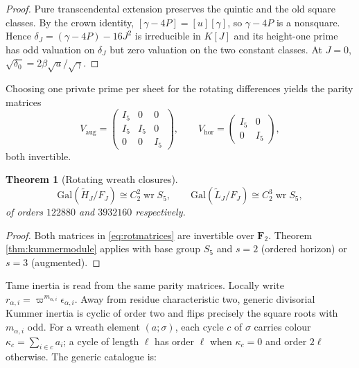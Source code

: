 \documentclass[11pt,a4paper]{article}
\newtheorem{theorem}{Theorem}[section]
\theoremstyle{definition}
\theoremstyle{remark}
\newcommand{\FF}{\mathbf{F}}
\newcommand{\Gal}{\mathrm{Gal}}
\newcommand{\wrp}{\mathop{\mathrm{wr}}}
\begin{document}
\begin{proof}
Pure transcendental extension preserves the quintic and the old square classes.
By the crown identity, \([\gamma-4P]=[u][\gamma]\), so \(\gamma-4P\) is a
nonsquare. Hence \(\delta_J=(\gamma-4P)-16J^2\) is irreducible in \(K[J]\) and
its height-one prime has odd valuation on \(\delta_J\) but zero valuation on
the two constant classes. At \(J=0\),
\(\sqrt{\delta_0}=2\beta\sqrt u/\sqrt\gamma\).
\end{proof}

Choosing one private prime per sheet for the rotating differences yields the
parity matrices
\begin{equation}
V_{\mathrm{aug}}
=
\begin{pmatrix}I_5&0&0\\I_5&I_5&0\\0&0&I_5\end{pmatrix},
\qquad
V_{\mathrm{hor}}
=
\begin{pmatrix}I_5&0\\0&I_5\end{pmatrix},
\label{eq:rotmatrices}
\end{equation}
both invertible.

\begin{theorem}[Rotating wreath closures]
\label{thm:rotwreath}
\[
\Gal(\widetilde H_J/F_J)\cong C_2^2\wrp S_5,
\qquad
\Gal(\widetilde L_J/F_J)\cong C_2^3\wrp S_5,
\]
of orders \(122880\) and \(3932160\) respectively.
\end{theorem}

\begin{proof}
Both matrices in \eqref{eq:rotmatrices} are invertible over \(\FF_2\). Theorem
\ref{thm:kummermodule} applies with base group \(S_5\) and \(s=2\) (ordered
horizon) or \(s=3\) (augmented).
\end{proof}

Tame inertia is read from the same parity matrices. Locally write
\(r_{\alpha,i}=\varpi^{m_{\alpha,i}}\epsilon_{\alpha,i}\). Away from residue
characteristic two, generic divisorial Kummer inertia is cyclic of order two
and flips precisely the square roots with \(m_{\alpha,i}\) odd. For a wreath
element \((a;\sigma)\), each cycle \(c\) of \(\sigma\) carries colour
\(\kappa_c=\sum_{i\in c}a_i\); a cycle of length \(\ell\) has order \(\ell\)
when \(\kappa_c=0\) and order \(2\ell\) otherwise. The generic catalogue is:
\end{document}
